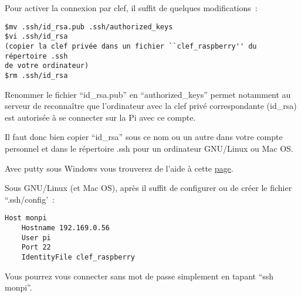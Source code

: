Pour activer la connexion par clef, il suffit de quelques modifications~:
\begin{verbatim}
$mv .ssh/id_rsa.pub .ssh/authorized_keys
$vi .ssh/id_rsa
(copier la clef privée dans un fichier ``clef_raspberry'' du répertoire .ssh
de votre ordinateur)
$rm .ssh/id_rsa
\end{verbatim}

Renommer le fichier ``id\_rsa.pub'' en ``authorized\_keys'' permet notamment au serveur de reconnaître que l'ordinateur avec la clef privé correspondante (id\_rsa) est autorisée à se connecter  sur la Pi avec ce compte.

Il faut donc bien copier ``id\_rsa'' sous ce nom ou un autre dans votre compte personnel et dans le répertoire .ssh pour un ordinateur GNU/Linux ou Mac OS.

Avec putty sous Windows vous trouverez de l'aide à cette \href{https://www.howtoforge.com/ssh_key_based_logins_putty}{page}.  

Sous GNU/Linux (et Mac OS), après il suffit de configurer ou de créer le fichier ``.ssh/config'~:

\begin{verbatim}
Host monpi
    Hostname 192.169.0.56
    User pi
    Port 22
    IdentityFile clef_raspberry
\end{verbatim}

Vous pourrez vous connecter sans mot de passe simplement en tapant ``ssh monpi''.
